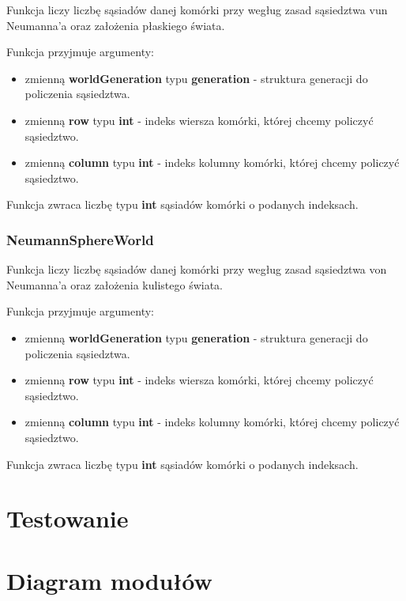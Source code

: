 \documentclass[a4paper]{article}
\begin{document}
\quad Funkcja liczy liczb\k{e} s\k{a}siad\'ow danej kom\'orki przy weg\l{}ug zasad s\k{a}siedztwa vun Neumanna'a oraz za\l{}o\.zenia p\l{}askiego \'swiata.

Funkcja przyjmuje argumenty:

\begin{itemize}
        \item zmienn\k{a} \textbf{worldGeneration} typu \textbf{generation} - struktura generacji do policzenia s\k{a}siedztwa.
        \item zmienn\k{a} \textbf{row} typu \textbf{int} - indeks wiersza kom\'orki, kt\'orej chcemy policzy\'c s\k{a}siedztwo.
        \item zmienn\k{a} \textbf{column} typu \textbf{int} - indeks kolumny kom\'orki, kt\'orej chcemy policzy\'c s\k{a}siedztwo.
\end{itemize}

\quad Funkcja zwraca liczb\k{e} typu \textbf{int} s\k{a}siad\'ow kom\'orki o podanych indeksach.


\subsubsection{NeumannSphereWorld}

\quad Funkcja liczy liczb\k{e} s\k{a}siad\'ow danej kom\'orki przy weg\l{}ug zasad s\k{a}siedztwa von Neumanna'a oraz za\l{}o\.zenia kulistego \'swiata.

Funkcja przyjmuje argumenty:

\begin{itemize}
        \item zmienn\k{a} \textbf{worldGeneration} typu \textbf{generation} - struktura generacji do policzenia s\k{a}siedztwa.
        \item zmienn\k{a} \textbf{row} typu \textbf{int} - indeks wiersza kom\'orki, kt\'orej chcemy policzy\'c s\k{a}siedztwo.
        \item zmienn\k{a} \textbf{column} typu \textbf{int} - indeks kolumny kom\'orki, kt\'orej chcemy policzy\'c s\k{a}siedztwo.
\end{itemize}

\quad Funkcja zwraca liczb\k{e} typu \textbf{int} s\k{a}siad\'ow kom\'orki o podanych indeksach.



\section{Testowanie}


\section{Diagram modu\l{}\'ow}
\end{document}
